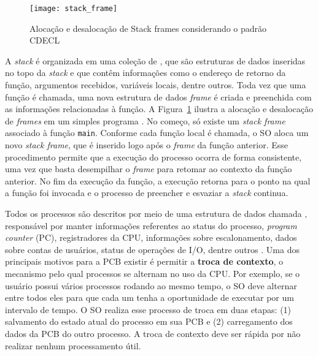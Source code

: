 \begin{figure}[!h]
  \centering
  \texttt{[image: stack\_frame]}
	\caption[Alocação e desalocação de Stack frames considerando o padrão CDECL]{Alocação e desalocação de Stack frames considerando o padrão CDECL~\citep{patterson}}
  \label{fig:stack_frames} 
\end{figure}


A \emph{stack} é organizada em uma coleção de , que
são estruturas de dados inseridas no topo da
\emph{stack} e que contêm informações como o endereço de retorno da função,
argumentos recebidos, variáveis locais, dentre outros. Toda vez que uma função
é chamada, uma nova estrutura de dados \emph{frame} é criada e preenchida com
as informações relacionadas à função.
A Figura~\ref{fig:stack_frames} ilustra a alocação e desalocação de
\textit{frames} em um simples programa \citep{gdb}. No começo, só existe um
\emph{stack frame} associado à função \texttt{main}. Conforme cada
função local é chamada, o SO aloca um novo \emph{stack frame}, que é
inserido logo após o \emph{frame} da função anterior. Esse procedimento permite
que a execução do processo ocorra de forma consistente, uma vez que basta
desempilhar o \emph{frame} para retomar ao contexto da função anterior. No fim
da execução da função, a execução retorna para o ponto na qual a função foi invocada e
o processo de preencher e esvaziar a \emph{stack} continua.

Todos os processos são descritos por meio de uma estrutura de dados chamada
, responsável por manter
informações referentes ao status do processo, \emph{program counter} (PC),
registradores da CPU, informações sobre escalonamento, dados sobre contas de
usuários, status de operações de I/O, dentre outros \citep{silberschatz}.
Uma dos principais motivos para a PCB existir é permitir a \textbf{troca de
contexto}, o mecanismo pelo qual processos se alternam no uso da CPU.
Por exemplo, se o usuário possui vários processos rodando ao mesmo tempo, o
SO deve alternar entre todos eles para que cada um tenha a oportunidade
de executar por um intervalo de tempo. O SO realiza esse processo de troca em duas
etapas: (1) salvamento do estado atual do processo em sua PCB e (2) carregamento dos dados da PCB do outro
processo. A troca de contexto deve ser rápida por não
realizar nenhum processamento útil.

